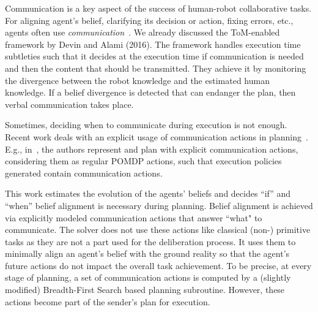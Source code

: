 \documentclass[letterpaper]{article} %
\begin{document}
Communication is a key aspect of the success of human-robot collaborative tasks.
For aligning agent's belief, clarifying its decision or action, fixing errors, etc., agents often use \textit{communication}~\cite{tellex2014asking,sebastiani2017dealing}. We already discussed the ToM-enabled framework by Devin and Alami (2016). The framework handles execution time subtleties such that it decides at the execution time if communication is needed and then the content that should be transmitted. 
They achieve it by monitoring the divergence between the robot knowledge and the estimated human knowledge. If a belief divergence is detected that can endanger the plan, then verbal communication takes place. 

Sometimes, deciding when to communicate during execution is not enough. Recent work deals with an explicit usage of communication actions in planning~\cite{BuisanSA20,nikolaidis2018planning,roncone2017transparent,sanelli2017short,UnhelkarLS20}. 
E.g., in~\cite{roncone2017transparent,UnhelkarLS20}, the authors represent and plan with explicit communication actions, considering them as regular POMDP actions, such that execution policies generated contain communication actions.

This work estimates the evolution of the agents' beliefs and decides ``if'' and ``when'' belief alignment is necessary during planning. Belief alignment is achieved via explicitly modeled communication actions that answer ``what" to communicate. The solver does not use these actions like classical (non-) primitive tasks as they are not a part used for the deliberation process. It uses them to minimally align an agent's belief with the ground reality so that the agent's future actions do not impact the overall task achievement. To be precise, at every stage of planning, a set of communication actions is computed by a (slightly modified) Breadth-First Search based planning subroutine. However, these actions become part of the sender's plan for execution.    







\end{document}
